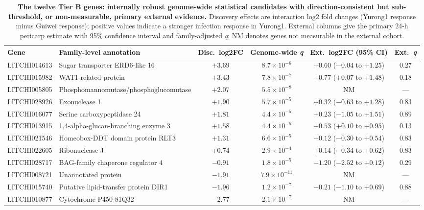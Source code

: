 \documentclass[11pt]{article}
\newcommand{\q}{\textit{q}}
\begin{document}
\begin{table}[t]
\centering
\caption{\textbf{The twelve Tier B genes: internally robust genome-wide statistical candidates with direction-consistent but sub-threshold, or non-measurable, primary external evidence.} Discovery effects are interaction log2 fold changes (Yurong1 response minus Guiwei response); positive values indicate a stronger infection response in Yurong1. External columns give the primary 24-h pericarp estimate with 95\% confidence interval and family-adjusted \q; NM denotes genes not measurable in the external cohort.}
\label{tab:tierb}
\footnotesize
\setlength{\tabcolsep}{3pt}
\begin{tabular}{@{}llcccc@{}}
\toprule
\textbf{Gene} & \textbf{Family-level annotation} & \textbf{Disc.\ log2FC} & \textbf{Genome-wide \q} & \textbf{Ext.\ log2FC (95\% CI)} & \textbf{Ext.\ \q} \\
\midrule
LITCHI014613 & Sugar transporter ERD6-like 16 & $+3.69$ & $8.7\times10^{-6}$ & $+0.60$ ($-0.04$ to $+1.25$) & 0.27 \\
LITCHI015982 & WAT1-related protein & $+3.43$ & $7.8\times10^{-7}$ & $+0.77$ ($+0.07$ to $+1.48$) & 0.18 \\
LITCHI005805 & Phosphomannomutase/phosphoglucomutase & $+2.07$ & $5.5\times10^{-8}$ & NM & --- \\
LITCHI028926 & Exonuclease 1 & $+1.90$ & $5.7\times10^{-5}$ & $+0.32$ ($-0.63$ to $+1.28$) & 0.83 \\
LITCHI016077 & Serine carboxypeptidase 24 & $+1.81$ & $4.4\times10^{-5}$ & $+0.23$ ($-1.05$ to $+1.51$) & 0.89 \\
LITCHI013915 & 1,4-alpha-glucan-branching enzyme 3 & $+1.58$ & $4.4\times10^{-5}$ & $+0.53$ ($+0.10$ to $+0.95$) & 0.13 \\
LITCHI021546 & Homeobox-DDT domain protein RLT3 & $+1.31$ & $6.6\times10^{-5}$ & $+0.12$ ($-0.30$ to $+0.54$) & 0.83 \\
LITCHI022605 & Ribonuclease J & $+0.74$ & $2.9\times10^{-4}$ & $+0.14$ ($-0.34$ to $+0.62$) & 0.83 \\
LITCHI028717 & BAG-family chaperone regulator 4 & $-0.91$ & $1.8\times10^{-5}$ & $-1.20$ ($-2.52$ to $+0.12$) & 0.29 \\
LITCHI008721 & Unannotated protein & $-1.91$ & $7.9\times10^{-11}$ & NM & --- \\
LITCHI015740 & Putative lipid-transfer protein DIR1 & $-1.96$ & $1.2\times10^{-7}$ & $-0.21$ ($-1.10$ to $+0.69$) & 0.88 \\
LITCHI010877 & Cytochrome P450 81Q32 & $-2.77$ & $2.1\times10^{-7}$ & NM & --- \\
\bottomrule
\end{tabular}
\end{table}
\end{document}
